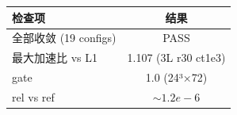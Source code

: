 \begin{tabular}{l c}
\hline
检查项 & 结果 \\
\hline
全部收敛 (19 configs) & PASS \\
最大加速比 vs L1 & 1.107 (3L r30 ct1e3) \\
gate & 1.0 (24³×72) \\
rel vs ref & $\sim1.2e-6$ \\
\hline
\end{tabular}
